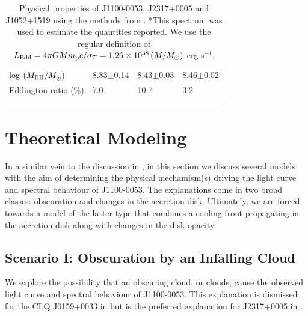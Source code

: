\documentclass[a4paper,fleqn,usenatbib]{mnras}
\begin{document}
\begin{table}
\begin{tabular}{l l l l}
    log $(M_{\rm BH} / M_{\odot})  $           &  8.83$\pm$0.14                & 8.43$\pm$0.03           & 8.46$\pm$0.02 \\
    Eddington ratio  (\%)                        &        7.0                         &  10.7                           &  3.2     \\ 
    &&\\
    \hline \hline 
  \end{tabular}
  \caption{Physical properties of J1100-0053, J2317+0005 and J1052+1519 using the
    methods from \citet{Shen2011}. *This spectrum was used to estimate
    the quantities reported.  We use the regular definition of $L_{\rm
      Edd} = 4 \pi G M m_{\rm p} c /\sigma_{T} =
    1.26\times10^{38}\left (M/M_{\odot} \right )$ erg s$^{-1}$.} 
 \label{tab:Shen_props}
\end{table}



\section{Theoretical Modeling} 
In a similar vein to the discussion in \cite{Stern2018}, in this
section we discuss several models with the aim of determining the
physical mechamism(s) driving the light curve and spectral behaviour
of J1100-0053. The explanations come in two broad classes: obscuration
and changes in the accretion disk. Ultimately, we are forced towards
a model of the latter type that combines a cooling front propagating
in the accretion disk along with changes in the disk opacity.

\subsection{Scenario I: Obscuration by an Infalling Cloud}
We explore the possibility that an obscuring cloud, or clouds, cause
the observed light curve and spectral behaviour of J1100-0053. This
explanation is dismissed for the CLQ J0159+0033 in \citet{LaMassa2015}
but is the preferred explanation for J2317+0005 in \citet{Guo2016}.
\end{document}
